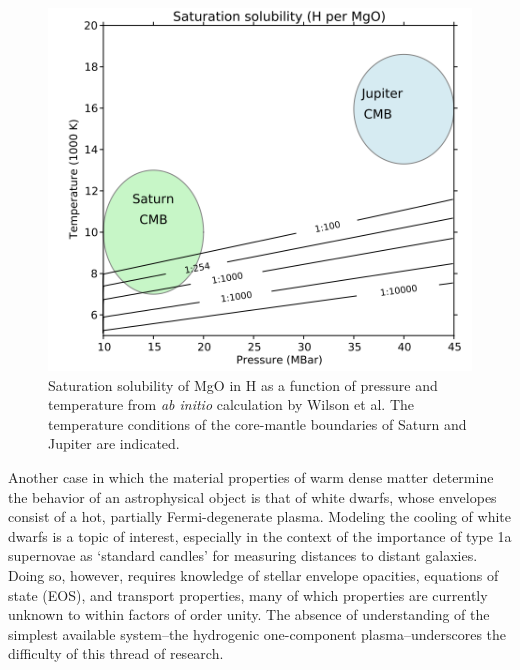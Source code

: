 \documentclass [11pt, proquest, article] {uwthesis}[2016/11/22]
\begin{document}
\begin{figure}[h] 
\caption{Saturation solubility of MgO in H as a function of pressure and temperature from \emph{ab initio} calculation by Wilson et al. The temperature conditions of the core-mantle boundaries of Saturn and Jupiter are indicated. \cite{wilson2012rocky}}
\label{fig:wilson}
\centering
\includegraphics[scale=0.65]{../Figures/wilson_solubility.png}
\end{figure}


Another case in which the material properties of warm dense matter determine the behavior of an astrophysical object is that of white dwarfs, whose envelopes consist of a hot, partially Fermi-degenerate plasma. Modeling the cooling of white dwarfs is a topic of interest, especially in the context of the importance of type 1a supernovae as `standard candles' for measuring distances to distant galaxies. \cite{hansen1999cooling} Doing so, however, requires knowledge of stellar envelope opacities, equations of state (EOS), and transport properties, many of which properties are currently unknown to within factors of order unity. The absence of understanding of the simplest available system--the hydrogenic one-component plasma--underscores the difficulty of this thread of research.
\end{document}

